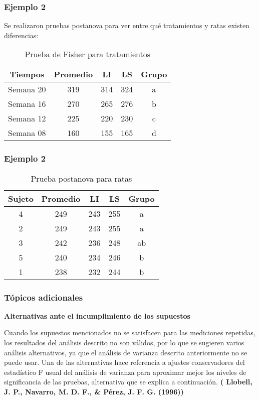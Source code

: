 \documentclass[12pt]{beamer}
\begin{document}
\begin{frame}
\frametitle{Ejemplo 2}
Se realizaron pruebas postanova para ver entre qué tratamientos y ratas existen diferencias:
\begin{table}[htbp]
  \centering
\resizebox{12cm}{!} {
\begin{tabular}{|c|c|c|c|c|}
\hline 
\textbf{Tiempos} & \textbf{Promedio}  & \textbf{LI} & \textbf{LS} & \textbf{Grupo}\\ 
\hline 
Semana 20  &  319&      314  &    324 &    a\\ 
Semana 16  &  270&      265  &    276  &  b\\  
 Semana 12  &  225&   220  &    230 &  c\\   
 Semana 08  &  160&     155  &    165 & d\\    
\hline 
\end{tabular} 
}
\caption{Prueba de Fisher para tratamientos}
\label{tab:addlabel}%
\end{table}%
\end{frame}

\begin{frame}
\frametitle{Ejemplo 2}
\begin{table}[htbp]
  \centering
\resizebox{12cm}{!} {
\begin{tabular}{|c|c|c|c|c|}
\hline 
\textbf{Sujeto} & \textbf{Promedio} & \textbf{LI} & \textbf{LS} & \textbf{Grupo}\\ 
\hline 
4   &    249&     243&      255&  a    \\
 2   &    249&      243&      255&  a    \\
 3   &    242&      236&      248&  ab    \\
  5   &    240&      234&      246&  b  \\  
 1   &    238&       232&      244&  b\\    
\hline 
\end{tabular} 
}
\caption{Prueba postanova para ratas}
\label{tab:addlabel}%
\end{table}%
\end{frame}

\begin{frame}
\frametitle{Tópicos adicionales}
\textbf{Alternativas ante el incumplimiento de los supuestos}

Cuando los supuestos mencionados no se satisfacen para las mediciones repetidas, los resultados
del análisis descrito no son válidos, por lo que se sugieren varios análisis alternativos, ya que el
análisis de varianza descrito anteriormente no se puede usar. Una de las alternativas hace
referencia a ajustes conservadores del estadístico F usual del análisis de varianza para aproximar
mejor los niveles de significancia de las pruebas, alternativa que se explica a continuación.
\textbf{( Llobell, J. P., Navarro, M. D. F., \& Pérez, J. F. G. (1996))}
\end{frame}
\end{document}
